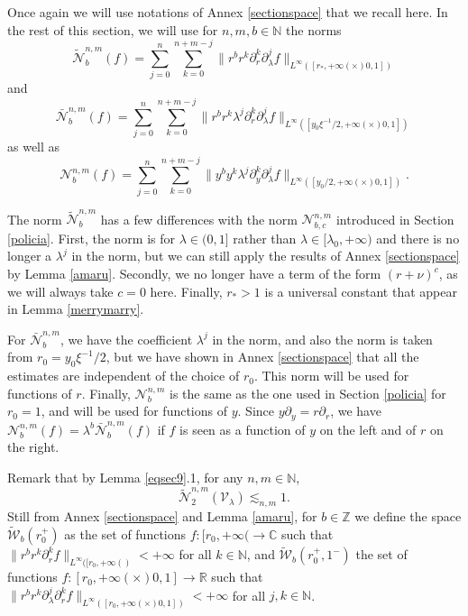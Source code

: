 \documentclass[11 pt]{amsart}
\theoremstyle{definition}
\theoremstyle{remark}
\numberwithin{equation}{section}
\begin{document}
Once again we will use notations of Annex \ref{sectionspace} that we recall
here. In the rest of this section, we will use for $n, m, b \in \mathbb{N}$
the norms
\[ \widetilde{\mathcal{N}}_b^{n, m} (f) = \sum_{j = 0}^n \sum_{k = 0}^{n + m
   - j} \| r^b r^k \partial_r^k \partial_{\lambda}^j f \|_{L^{\infty} ([r_\ast, +
   \infty (\times) 0, 1])} \]
and
\[ \bar{\mathcal{N}}_b^{n, m} (f) = \sum_{j = 0}^n \sum_{k = 0}^{n + m -
   j} \| r^b r^k \lambda^j \partial_r^k \partial_{\lambda}^j f \|_{L^{\infty}
   ([y_0\xi^{- 1}/2, + \infty (\times) 0, 1])} \]
as well as
\[ \mathcal{N}_b^{n, m} (f) = \sum_{j = 0}^n \sum_{k = 0}^{n + m - j} \|
   y^b y^k \lambda^j \partial_y^k \partial_{\lambda}^j f \|_{L^{\infty} ([y_0/2, +
   \infty (\times) 0, 1])}. \]

The norm $\widetilde{\mathcal{N}}_b^{n, m}$ has a few differences with the norm $\mathcal{N}_{b, c}^{n, m}$ introduced in Section \ref{policia}. First, the norm
is for $\lambda \in (0, 1]$ rather than $\lambda \in [\lambda_0, + \infty )$
and there is no longer a $\lambda^j$ in the norm, but we can still apply the
results of Annex \ref{sectionspace} by Lemma \ref{amaru}. Secondly, we no
longer have a term of the form $(r + \nu)^c$, as we will always take $c = 0$
here. Finally, $r_\ast > 1$ is a universal constant that appear in Lemma \ref{merrymarry}.

For $\bar{\mathcal{N}}_b^{n, m}$, we have the coefficient $\lambda^j$ in the
norm, and also the norm is taken from $r_0 = y_0\xi^{- 1}/2$, but we have shown in
Annex \ref{sectionspace} that all the estimates are independent of the
choice of $r_0$. This norm will be used for functions of $r$. Finally,
$\mathcal{N}_b^{n, m}$ is the same as the one used in Section \ref{policia} for $r_0 =
1$, and will be used for functions of $y$. Since $y\partial_y = r \partial_r$, we have $\mathcal{N}_b^{n, m}(f)=\lambda^b \bar{\mathcal{N}}_b^{n, m}(f)$ if $f$ is seen as a function of $y$ on the left and of $r$ on the right.

Remark that by Lemma \ref{eqsec9}.1, for any $n, m \in \mathbb{N}$,
\begin{equation}
  \widetilde{\mathcal{N}}_2^{n, m} (\mathcal{V}_{\lambda}) \lesssim_{n, m} 1. \label{dusk}
\end{equation}
Still from Annex \ref{sectionspace} and Lemma \ref{amaru}, for $b \in
\mathbb{Z}$ we define the space $\widetilde{\mathcal{W}}_b (r_0^+)$ as the set of
functions $f : [r_0, + \infty (\rightarrow \mathbb{C}$ such that $\| r^b r^k
\partial_r^k f \|_{L^{\infty} ([r_0, + \infty ()} < + \infty$ for all $k \in
\mathbb{N}$, and $\widetilde{\mathcal{W}}_b (r_0^+, 1^-)$ the set of functions $f
: [r_0, + \infty (\times) 0, 1] \rightarrow \mathbb{R}$ such that $\| r^b r^k
\partial_{\lambda}^j \partial_r^k f \|_{L^{\infty} ([r_0, + \infty (\times) 0,
1])} < + \infty$ for all $j, k \in \mathbb{N}$.
\end{document}

